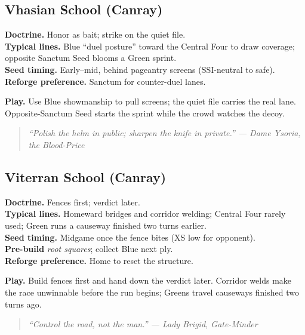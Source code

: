 \documentclass[11pt]{article}
\providecommand{\playdesc}[1]{\par\smallskip\noindent\small\textbf{Play.} #1\par}
\begin{document}
\subsection*{Vhasian School (Canray)}
\textbf{Doctrine.} Honor as bait; strike on the quiet file.\\
\textbf{Typical lines.} Blue ``duel posture'' toward the Central Four to draw coverage; opposite Sanctum Seed blooms a Green sprint.\\
\textbf{Seed timing.} Early--mid, behind pageantry screens (SSI-neutral to safe).\\
\textbf{Reforge preference.} Sanctum for counter-duel lanes.
\playdesc{Use Blue showmanship to pull screens; the quiet file carries the real lane. Opposite-Sanctum Seed starts the sprint while the crowd watches the decoy.}
\begin{quote}\small\itshape
``Polish the helm in public; sharpen the knife in private.'' --- Dame Ysoria, the Blood-Price
\end{quote}
\subsection*{Viterran School (Canray)}
\textbf{Doctrine.} Fences first; verdict later.\\
\textbf{Typical lines.} Homeward bridges and corridor welding; Central Four rarely used; Green runs a causeway finished two turns earlier.\\
\textbf{Seed timing.} Midgame once the fence bites (XS low for opponent).\\
\textbf{Pre-build} \emph{root squares}; collect Blue next ply. \\
\textbf{Reforge preference.} Home to reset the structure.
\playdesc{Build fences first and hand down the verdict later. Corridor welds make the race unwinnable before the run begins; Greens travel causeways finished two turns ago.}
\begin{quote}\small\itshape
``Control the road, not the man.'' --- Lady Brigid, Gate-Minder
\end{quote}

\end{document}
